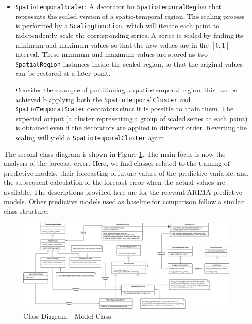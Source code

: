\begin{itemize}
	\item \texttt{SpatioTemporalScaled}: A decorator for \texttt{SpatioTemporalRegion} that represents the scaled version of a spatio-temporal region. The scaling process is performed by a \texttt{ScalingFunction}, which will iterate each point to independently scale the corresponding series. A series is scaled by finding its minimum and maximum values so that the new values are in the $[0, 1]$ interval. These minimum and maximum values are stored as two \texttt{SpatialRegion} instances inside the scaled region, so that the original values can be restored at a later point. 
	
	Consider the example of partitioning a spatio-temporal region: this can be achieved b applying both the \texttt{SpatioTemporalCluster} and \texttt{SpatioTemporalScaled} decorators since it is possible to chain them. The expected output (a cluster representing a group of scaled series at each point) is obtained even if the decorators are applied in different order. Reverting the scaling will yield a \texttt{SpatioTemporalCluster} again.
\end{itemize}

The second class diagram is shown in Figure \ref{Fig:DiagramClasess-Models}. The main focus is now the analysis of the forecast error. Here, we find classes related to the training of predictive models, their forecasting of future values of the predictive variable, and the subsequent calculation of the forecast error when the actual values are available. The descriptions provided here are for the relevant ARIMA predictive models. Other predictive models used as baseline for comparison follow a similar class structure.

\begin{figure}[tp]
	\centering
	\includegraphics[scale=0.37, angle=90]{../Figures/SPT-TSA-ModelsClasses}
	\caption{Class Diagram -- Model Class.}	
	\label{Fig:DiagramClasess-Models}	 		
\end{figure}

